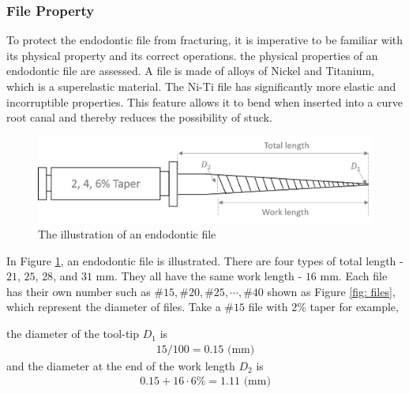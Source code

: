 \subsubsection{File Property}
\hspace*{6mm}To protect the endodontic file from fracturing, it is imperative to be familiar with its physical property and its correct operations. the physical properties of an endodontic file are assessed. A file is made of alloys of Nickel and Titanium, which is a superelastic material. The Ni-Ti file has significantly more elastic and incorruptible properties. This feature allows it to bend when inserted into a curve root canal and thereby reduces the possibility of stuck.
\begin{figure}[htbp]
\begin{center}
\includegraphics[width=1\linewidth]{Images/Endodontic_File.png}
\caption{The illustration of an endodontic file
}\label{fig: Endodontic File}
\end{center}
\end{figure}	
\par
In Figure \ref{fig: Endodontic File}, an endodontic file is illustrated. There are four types of total length - $21$, $25$, $28$, and $31$ mm. They all have the same work length - $16$ mm. Each file has their own number such as $\#15, \#20, \#25, \cdots, \#40$ shown as Figure \ref{fig: files}, which represent the diameter of files. Take a $\#15$ file with $2\%$ taper for example,
\par\noindent
the diameter of the tool-tip $D_1$ is
\begin{equation*}
\begin{split}
15/100=0.15 \text{ (mm)}
\end{split}
\end{equation*}
and the diameter at the end of the work length $D_2$ is
\begin{equation*}
\begin{split}
0.15 + 16 \cdot 6\% = 1.11 \text{ (mm)}
\end{split}
\end{equation*}
\par
